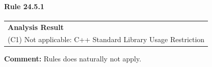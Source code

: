 \paragraph{Rule 24.5.1}
\begin{longtable}{p{13cm}}
\textbf{Analysis Result} \\
(C1) Not applicable: C++ Standard Library Usage Restriction \\
\end{longtable}
\textbf{Comment:} Rules does naturally not apply. \\
